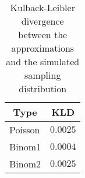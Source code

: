 \begin{table}[!tbp]
\caption{Kulback-Leibler divergence between the approximations and the simulated sampling distribution\label{tab:kld}} 
\begin{center}
\begin{tabular}{lr}
\hline\hline
\multicolumn{1}{c}{Type}&\multicolumn{1}{c}{KLD}\tabularnewline
\hline
Poisson&$0.0025$\tabularnewline
Binom1&$0.0004$\tabularnewline
Binom2&$0.0025$\tabularnewline
\hline
\end{tabular}\end{center}
\end{table}
